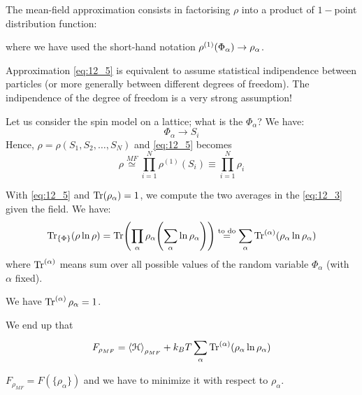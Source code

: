 \documentclass[../main/main.tex]{subfiles}
\begin{document}
The mean-field approximation consists in factorising \( \rho  \) into a product of \( 1- \)point distribution function:
where we have used the short-hand notation \(  \rho^{(1)}\qty(\Phi _ \alpha ) \rightarrow  \rho _ \alpha \).
\begin{remark}
Approximation \eqref{eq:12_5} is equivalent to assume statistical indipendence between particles (or more generally between different degrees of freedom). The indipendence of the degree of freedom is a very strong assumption!
\end{remark}
\begin{example}{}{}
Let us consider the spin model on a lattice; what is the \( \Phi _ \alpha  \)? We have:
\begin{equation*}
   \Phi _ \alpha  \rightarrow S_i
\end{equation*}
Hence, \( \rho = \rho (S_1,S_2, \dots, S_N) \) and \eqref{eq:12_5} becomes
\begin{equation}
  \rho \overset{MF}{\simeq } \prod_{i =1}^{N} \rho ^{(1)} (S_i) \equiv \prod_{i =1}^{N} \rho_ i
\end{equation}
\end{example}
With \eqref{eq:12_5} and \( \Tr(\rho _ \alpha ) =1 \), we compute the two averages in the \eqref{eq:12_3} given the field. We have:
\begin{equation}
  \Tr_{\{ \Phi  \}  } ( \rho \ln{\rho } ) = \Tr(\prod_{\alpha }^{} \rho _ \alpha  \qty( \sum_{\alpha }^{} \ln{\rho _ \alpha }  ) ) \overset{\text{to do}}{=} \sum_{\alpha }^{}
  \Tr^{(\alpha )}(\rho _ \alpha  \ln{\rho _ \alpha } )
\end{equation}
where \( \Tr^{(\alpha )} \) means sum over all possible values of the random variable \( \Phi _ \alpha  \) (with \( \alpha  \) fixed).
\begin{remark}
We have \( \Tr^{(\alpha )} \rho _ \alpha = 1 \).
\end{remark}
We end up that
\begin{equation}
  F_{\rho _{MF}} = \expval{\mathcal{H}}_{\rho _{MF}} + k_B T \sum_{\alpha }^{} \Tr^{(\alpha )}(\rho _ \alpha  \ln{\rho _ \alpha } )
\end{equation}
\begin{remark}
\( F_{\rho _{MF}} = F ( \{ \rho _ \alpha  \}  ) \)  and we have to minimize it with respect to \( \rho _ \alpha  \).
\end{remark}
\end{document}
